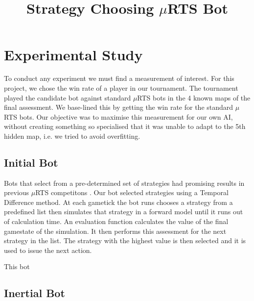 \documentclass[]{article}
\title{Strategy Choosing $\mu$RTS Bot}
\author{}
\begin{document}
\maketitle

\begin{abstract}

\end{abstract}

\section{Experimental Study}
To conduct any experiment we must find a measurement of interest. For this project, we chose the win rate of a player in our tournament. The tournament played the candidate bot against standard $\mu$RTS bots in the 4 known maps of the final assessment. We base-lined this by getting the win rate for the standard $\mu$RTS bots. Our objective was to maximise this measurement for our own AI, without creating something so specialised that it was unable to adapt to the 5th hidden map, i.e. we tried to avoid overfitting. 

\subsection{Initial Bot}
Bots that select from a pre-determined set of strategies had promising results in previous $\mu$RTS competitons \cite{firstcomp}. Our bot selected strategies using a Temporal Difference method. At each gametick the bot runs chooses a strategy from a predefined list then simulates that strategy in  a forward model until it runs out of calculation time. An evaluation function calculates the value of the final gamestate of the simulation. It then performs this assessment for the next strategy in the list. The strategy with the highest value is then selected and it is used to issue the next action. 

This bot 

\subsection{Inertial Bot}



\end{document}
